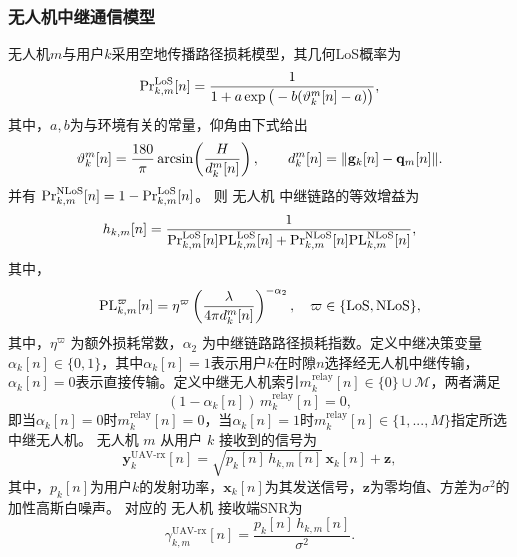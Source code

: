 \subsubsection{无人机中继通信模型}
无人机$m$与用户$k$采用空地传播路径损耗模型，其几何LoS概率为 
\begin{equation} 
{\Pr}^{\rm LoS}_{k,m}[n]=\frac{1}{1+a\exp\big(-b(\vartheta_k^m[n]-a)\big)}, 
\end{equation} 
其中，$a,b$为与环境有关的常量，仰角由下式给出
\begin{equation} 
\vartheta_k^m[n]=\frac{180}{\pi}\arcsin\!\left(\frac{H}{d_k^m[n]}\right),\qquad d_k^m[n]=\|{\bf g}_k[n]-{\bf q}_m[n]\|. 
\end{equation} 
并有 ${\Pr}^{\rm NLoS}_{k,m}[n]=1-{\Pr}^{\rm LoS}_{k,m}[n]$。
则 无人机 中继链路的等效增益为 
\begin{equation} 
h_{k,m}[n]=\frac{1}{{\Pr}^{\rm LoS}_{k,m}[n]{\rm PL}_{k,m}^{\rm LoS}[n]+{\Pr}^{\rm NLoS}_{k,m}[n]{\rm PL}_{k,m}^{\rm NLoS}[n]}, 
\end{equation} 
其中，
\begin{equation} 
{\rm PL}_{k,m}^{\varpi }[n]=\eta^\varpi\left(\frac{\lambda}{4\pi d_k^m[n]}\right)^{-\alpha_2},\quad \varpi\in\{\rm LoS,NLoS\}, 
\end{equation} 
其中，$\eta^\varpi$ 为额外损耗常数，$\alpha_2$ 为中继链路路径损耗指数。定义中继决策变量$\alpha_k[n]\in\{0,1\}$，其中$\alpha_k[n]=1$表示用户$k$在时隙$n$选择经无人机中继传输，$\alpha_k[n]=0$表示直接传输。定义中继无人机索引$m_k^{\text{relay}}[n]\in\{0\}\cup\mathcal{M}$，两者满足
\begin{equation}
(1-\alpha_k[n])\, m_k^{\text{relay}}[n] = 0,
\end{equation}
即当$\alpha_k[n]=0$时$m_k^{\text{relay}}[n]=0$，当$\alpha_k[n]=1$时$m_k^{\text{relay}}[n]\in\{1,...,M\}$指定所选中继无人机。
无人机 $m$ 从用户 $k$ 接收到的信号为
\begin{equation}
\mathbf{y}_k^{\text{UAV-rx}}[n]=\sqrt{p_k[n]\,h_{k,m}[n]}\,{\mathbf{x}}_k[n]+\mathbf{z},
\end{equation}
其中，$p_k[n]$为用户$k$的发射功率，$\mathbf{x}_k[n]$为其发送信号，$\mathbf{z}$为零均值、方差为$\sigma^2$的加性高斯白噪声。
对应的 无人机 接收端SNR为
\begin{equation}
\gamma _{k,m}^{\text{UAV-rx}}[n]=\frac{p_k[n]\,h_{k,m}[n]}{\sigma^{2}}.
\end{equation}

